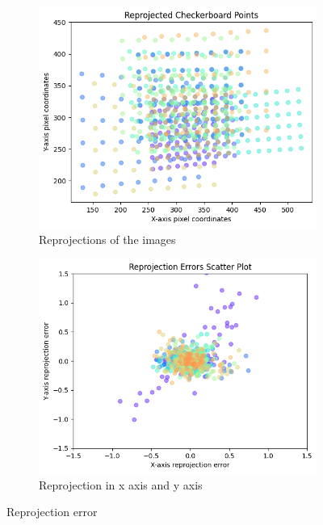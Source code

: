 \documentclass{article}
\begin{document}
\begin{figure}[H]
    \centering
    \begin{subfigure}[b]{0.45\textwidth}
        \includegraphics[width=\textwidth]{reprojection.png}
        \caption{Reprojections of the images}
        \label{fig:reprojection}
    \end{subfigure}
    \hfill
    \begin{subfigure}[b]{0.45\textwidth}
        \includegraphics[width=\textwidth]{error.png}
        \caption{Reprojection in x axis and y axis}
        \label{fig:error}
    \end{subfigure}
    \caption{Reprojection error}
    \label{fig:overall_reprojection}
\end{figure}
\end{document}
